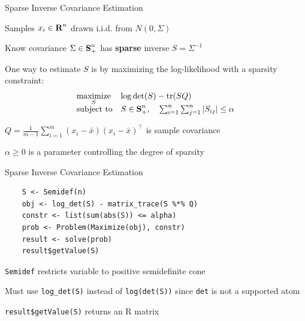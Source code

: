 \documentclass{beamer}
\begin{document}

\begin{frame}{Sparse Inverse Covariance Estimation}
	\BIT
		\item Samples $x_i \in {\mbox{\bf R}}^n$ drawn i.i.d. from $N(0,\Sigma)$
		\item Know covariance $\Sigma \in {\mbox{\bf S}}_+^n$ has \textbf{sparse} inverse $S = \Sigma^{-1}$
		
		\pause
		\item One way to estimate $S$ is by maximizing the log-likelihood with a sparsity constraint:
	\EIT
	\[
		\begin{array}{ll} \underset{S}{\mbox{maximize}} & \log\det(S) - \mbox{tr}(SQ) \\
			\mbox{subject to} & S \in {\mbox{\bf S}}_+^n, \quad \sum_{i=1}^n \sum_{j=1}^n |S_{ij}| \leq \alpha
		\end{array}
	\]
	\BIT
		\item $Q = \frac{1}{m-1}\sum_{i=1}^m (x_i - \bar x)(x_i - \bar x)^{\top}$ is sample covariance
		\item $\alpha \geq 0$ is a parameter controlling the degree of sparsity
	\EIT
\end{frame}

\begin{frame}[fragile]{Sparse Inverse Covariance Estimation}
	\begin{verbatim}
	S <- Semidef(n)
	obj <- log_det(S) - matrix_trace(S %*% Q)
	constr <- list(sum(abs(S)) <= alpha)
	prob <- Problem(Maximize(obj), constr)
	result <- solve(prob)
	result$getValue(S)
	\end{verbatim}
	\BIT
		\item \verb|Semidef| restricts variable to positive semidefinite cone
		\item Must use \verb|log_det(S)| instead of \verb|log(det(S))| since \verb|det| is not a supported atom
		\item \verb|result$getValue(S)| returns an R matrix
	\EIT
\end{frame}
\end{document}
